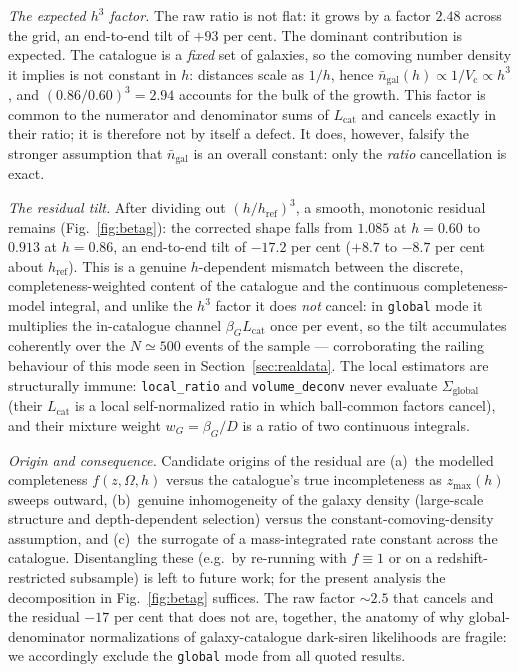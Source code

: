 \medskip
\noindent\textit{The expected $h^3$ factor.} The raw ratio is not
flat: it grows by a factor $2.48$ across the grid, an end-to-end tilt
of $+93$ per cent.
The dominant contribution is expected. The catalogue is a
\emph{fixed} set of galaxies, so the comoving number density it
implies is not constant in $h$: distances scale as $1/h$, hence
$\bar n_{\mathrm{gal}}(h) \propto 1/V_\mathrm{c} \propto h^3$, and
$(0.86/0.60)^3 = 2.94$ accounts for the bulk of the growth.
This factor is common to the numerator and denominator sums of
$L_{\mathrm{cat}}$ and cancels exactly in their ratio; it is therefore
not by itself a defect. It does, however, falsify the stronger
assumption that $\bar n_{\mathrm{gal}}$ is an overall constant: only
the \emph{ratio} cancellation is exact.

\medskip
\noindent\textit{The residual tilt.} After dividing out
$(h/h_{\mathrm{ref}})^3$, a smooth, monotonic residual remains
(Fig.~\ref{fig:betag}): the corrected shape falls from $1.085$ at
$h = 0.60$ to $0.913$ at $h = 0.86$, an end-to-end tilt of $-17.2$ per
cent ($+8.7$ to $-8.7$ per cent about $h_{\mathrm{ref}}$).
This is a genuine $h$-dependent mismatch between the discrete,
completeness-weighted content of the catalogue and the continuous
completeness-model integral, and unlike the $h^3$ factor it does
\emph{not} cancel: in \texttt{global} mode it multiplies the
in-catalogue channel $\beta_G L_{\mathrm{cat}}$ once per event, so the
tilt accumulates coherently over the $N \simeq 500$ events of the
sample
--- corroborating the railing behaviour of this mode seen in
Section~\ref{sec:realdata}. The local estimators are structurally
immune: \texttt{local\_ratio} and \texttt{volume\_deconv} never
evaluate $\Sigma_{\mathrm{global}}$ (their $L_{\mathrm{cat}}$ is a local
self-normalized ratio in which ball-common factors cancel), and their
mixture weight $w_G = \beta_G/D$ is a ratio of two continuous
integrals.

\medskip
\noindent\textit{Origin and consequence.} Candidate origins of the
residual are (a)~the modelled completeness $f(z,\Omega,h)$ versus the
catalogue's true incompleteness as $z_{\max}(h)$ sweeps outward,
(b)~genuine inhomogeneity of the galaxy density (large-scale structure
and depth-dependent selection) versus the constant-comoving-density
assumption, and (c)~the surrogate of a mass-integrated rate constant
across the catalogue.
Disentangling these (e.g.\ by re-running with $f \equiv 1$ or on a
redshift-restricted subsample) is left to future work; for the present
analysis the decomposition in Fig.~\ref{fig:betag} suffices. The raw
factor $\sim\!2.5$ that cancels and the residual $-17$ per cent that
does not are, together, the anatomy of why global-denominator
normalizations of galaxy-catalogue dark-siren likelihoods are fragile:
we accordingly exclude the \texttt{global} mode from all quoted
results.
